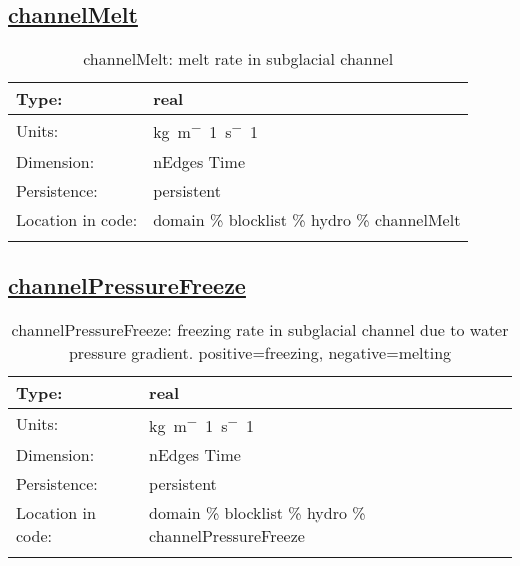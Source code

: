 \subsection[channelMelt]{\hyperref[sec:var_tab_hydro]{channelMelt}}
\label{subsec:var_sec_hydro_channelMelt}
\begin{center}
\begin{longtable}{| p{2.0in} | p{4.0in} |}
        \hline 
        Type: & real \\
        \hline 
        Units: & \si{kg.m^-1.s^-1} \\
        \hline 
        Dimension: & nEdges Time \\
        \hline 
        Persistence: & persistent \\
        \hline 
         Location in code: & domain \% blocklist \% hydro \% channelMelt \\
         \hline 
    \caption{channelMelt: melt rate in subglacial channel}
\end{longtable}
\end{center}
\subsection[channelPressureFreeze]{\hyperref[sec:var_tab_hydro]{channelPressureFreeze}}
\label{subsec:var_sec_hydro_channelPressureFreeze}
\begin{center}
\begin{longtable}{| p{2.0in} | p{4.0in} |}
        \hline 
        Type: & real \\
        \hline 
        Units: & \si{kg.m^-1.s^-1} \\
        \hline 
        Dimension: & nEdges Time \\
        \hline 
        Persistence: & persistent \\
        \hline 
         Location in code: & domain \% blocklist \% hydro \% channelPressureFreeze \\
         \hline 
    \caption{channelPressureFreeze: freezing rate in subglacial channel due to water pressure gradient.  positive=freezing, negative=melting}
\end{longtable}
\end{center}
